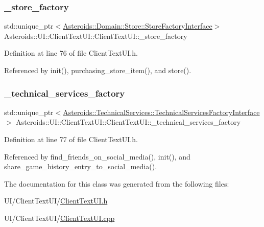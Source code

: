 \subsubsection{\texorpdfstring{\+\_\+store\+\_\+factory}{\_store\_factory}}
{\footnotesize\ttfamily std\+::unique\+\_\+ptr$<$\hyperlink{classAsteroids_1_1Domain_1_1Store_1_1StoreFactoryInterface}{Asteroids\+::\+Domain\+::\+Store\+::\+Store\+Factory\+Interface}$>$ Asteroids\+::\+U\+I\+::\+Client\+Text\+U\+I\+::\+Client\+Text\+U\+I\+::\+\_\+store\+\_\+factory\hspace{0.3cm}{\ttfamily [private]}}



Definition at line 76 of file Client\+Text\+U\+I.\+h.



Referenced by init(), purchasing\+\_\+store\+\_\+item(), and store().

\mbox{\label{classAsteroids_1_1UI_1_1ClientTextUI_1_1ClientTextUI_a52e7ca578c973a1c686de71abe86f0ad}} 
\subsubsection{\texorpdfstring{\+\_\+technical\+\_\+services\+\_\+factory}{\_technical\_services\_factory}}
{\footnotesize\ttfamily std\+::unique\+\_\+ptr$<$\hyperlink{classAsteroids_1_1TechnicalServices_1_1TechnicalServicesFactoryInterface}{Asteroids\+::\+Technical\+Services\+::\+Technical\+Services\+Factory\+Interface}$>$ Asteroids\+::\+U\+I\+::\+Client\+Text\+U\+I\+::\+Client\+Text\+U\+I\+::\+\_\+technical\+\_\+services\+\_\+factory\hspace{0.3cm}{\ttfamily [private]}}



Definition at line 77 of file Client\+Text\+U\+I.\+h.



Referenced by find\+\_\+friends\+\_\+on\+\_\+social\+\_\+media(), init(), and share\+\_\+game\+\_\+history\+\_\+entry\+\_\+to\+\_\+social\+\_\+media().



The documentation for this class was generated from the following files\+:\begin{DoxyCompactItemize}
\item 
U\+I/\+Client\+Text\+U\+I/\hyperlink{ClientTextUI_8h}{Client\+Text\+U\+I.\+h}\item 
U\+I/\+Client\+Text\+U\+I/\hyperlink{ClientTextUI_8cpp}{Client\+Text\+U\+I.\+cpp}\end{DoxyCompactItemize}
